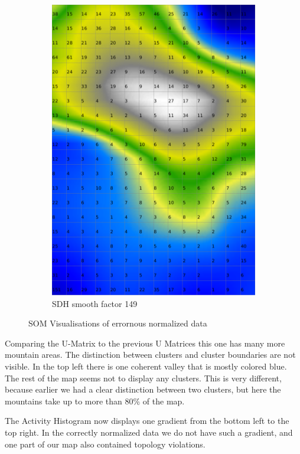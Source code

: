 \documentclass{acm_proc_article-sp}
\begin{document}
\begin{figure}
\begin{subfigure}[b]{0.45\linewidth}
        \includegraphics[width=\linewidth]{img/wine-weird-smoothed-data-histogram}
        \caption{SDH smooth factor 149}
        \label{fig:wine-weird-smoothed-data-histogram}
    \end{subfigure}
    \caption{SOM Visualisations of errornous normalized data}
\end{figure}

Comparing the U-Matrix to the previous U Matrices this one has many more mountain
areas. The distinction between clusters and cluster boundaries are not visible.
In the top left there is one coherent valley that is mostly colored blue.
The rest of the map seems not to display any clusters. This is very different, because
earlier we had a clear distinction between two clusters, but here the mountains
take up to more than 80\% of the map.

The Activity Histogram now displays one gradient from the bottom left to the top right.
In the correctly normalized data we do not have such a gradient, and one part of our map
also contained topology violations.
\end{document}
